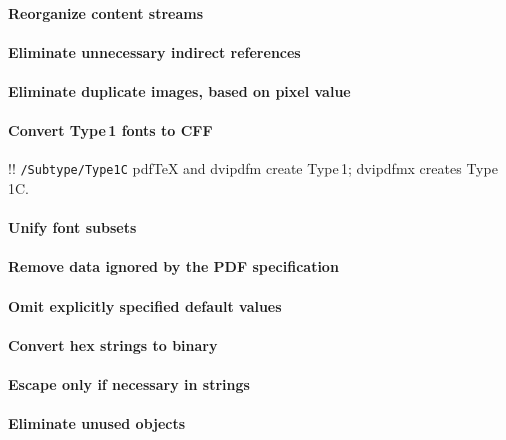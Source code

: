 \documentclass{ltugproc}
\def\cmd{\textsf}
\begin{document}
\paragraph{Reorganize content streams}

\paragraph{Eliminate unnecessary indirect references}

\paragraph{Eliminate duplicate images, based on pixel value}

\paragraph{Convert Type\,1 fonts to CFF}

!! \texttt{/Subtype/Type1C}
pdf\TeX{} and \cmd{dvipdfm} create Type\,1; dvipdfmx creates Type\,1C.

\paragraph{Unify font subsets}

\paragraph{Remove data ignored by the PDF specification}

\paragraph{Omit explicitly specified default values}

\paragraph{Convert hex strings to binary}

\paragraph{Escape only if necessary in strings}

\paragraph{Eliminate unused objects}
\end{document}
